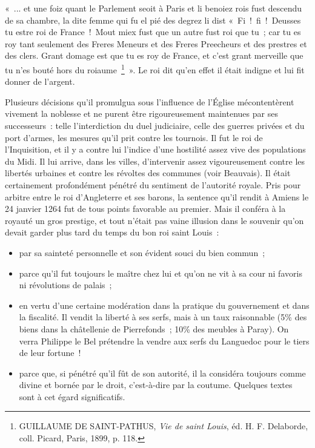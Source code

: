 \documentclass[french,twoside]{book} %
\newenvironment{quoteblock}%
  {\begin{quoting}}
  {\end{quoting}}
\newenvironment{quotebar}{%
    \def\FrameCommand{{\color{rubric!10!}\vrule width 0.5em} \hspace{0.9em}}%
    \def\OuterFrameSep{\itemsep} %
    \MakeFramed {\advance\hsize-\width \FrameRestore}
  }%
  {%
    \endMakeFramed
  }
\renewenvironment{quoteblock}%
  {%
    \savenotes
    \setstretch{0.9}
    \normalfont
    \begin{quotebar}
  }
  {%
    \end{quotebar}
    \spewnotes
  }
\begin{document}
\begin{quoteblock}
\noindent « ... et une foiz quant le Parlement seoit à Paris et li benoiez rois fust descendu de sa chambre, la dite femme qui fu el pié des degrez li dist « Fi ! fi ! Deusses tu estre roi de France ! Mout miex fust que un autre fust roi que tu ; car tu es roy tant seulement des Freres Meneurs et des Freres Preecheurs et des prestres et des clers. Grant domage est que tu es roy de France, et c’est grant merveille que tu n’es bouté hors du roiaume \footnote{ GUILLAUME DE SAINT-PATHUS, {\itshape Vie de saint Louis}, éd. H. F. Delaborde, coll. Picard, Paris, 1899, p. 118.} ». Le roi dit qu’en effet il était indigne et lui fit donner de l’argent.\end{quoteblock}

\noindent Plusieurs décisions qu’il promulgua sous l’influence de l’Église mécontentèrent vivement la noblesse et ne purent être rigoureusement maintenues par ses successeurs : telle l’interdiction du duel judiciaire, celle des guerres privées et du port d’armes, les mesures qu’il prit contre les tournois. Il fut le roi de l’Inquisition, et il y a contre lui l’indice d’une hostilité assez vive des populations du Midi. Il lui arrive, dans les villes, d’intervenir assez vigoureusement contre les libertés urbaines et contre les révoltes des communes (voir Beauvais). Il était certainement profondément pénétré du sentiment de l’autorité royale. Pris pour arbitre entre le roi d’Angleterre et ses barons, la sentence qu’il rendit à Amiens le 24 janvier 1264 fut de tous points favorable au premier. Mais il conféra à la royauté un gros prestige, et tout n’était pas vaine illusion dans le souvenir qu’on devait garder plus tard du temps du bon roi saint Louis :\par

\begin{itemize}[itemsep=0pt,]
\item par sa sainteté personnelle et son évident souci du bien commun ;
\item parce qu’il fut toujours le maître chez lui et qu’on ne vit à sa cour ni favoris ni révolutions de palais ;
\item en vertu d’une certaine modération dans la pratique du gouvernement et dans la fiscalité. Il vendit la liberté à ses serfs, mais à un taux raisonnable (5\% des biens dans la châtellenie de Pierrefonds ; 10\% des meubles à Paray). On verra Philippe le Bel prétendre la vendre aux serfs du Languedoc pour le tiers de leur fortune !
\item parce que, si pénétré qu’il fût de son autorité, il la considéra toujours comme divine et bornée par le droit, c’est-à-dire par la coutume. Quelques textes sont à cet égard significatifs.
\end{itemize}
\end{document}
